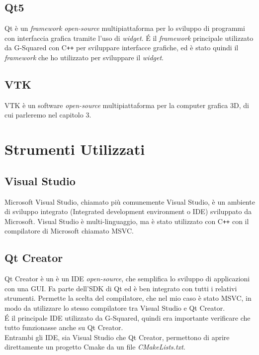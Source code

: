 \subsection{Qt5}\label{sec:Qt5}
Qt è un \emph{framework} \emph{open-source} multipiattaforma per lo sviluppo di programmi con interfaccia grafica tramite l'uso di \emph{widget}.
\'E il \emph{framework} principale utilizzato da G-Squared con C\texttt{++} per sviluppare interfacce grafiche, ed è stato quindi il \emph{framework} che ho utilizzato per sviluppare il \emph{widget}.

\subsection{VTK}
VTK è un software \emph{open-source} multipiattaforma per la computer grafica 3D, di cui parleremo nel capitolo 3.

\section{Strumenti Utilizzati}
\subsection{Visual Studio}\label{sec:visual-studio}
Microsoft Visual Studio, chiamato più comunemente Visual Studio, è un ambiente di sviluppo integrato (Integrated development environment o IDE) sviluppato da Microsoft.
Visual Studio è multi-linguaggio, ma è stato utilizzato con C\texttt{++} con il compilatore di Microsoft chiamato MSVC.

\subsection{Qt Creator}\label{sec:qt-creator}
Qt Creator è un è un IDE \emph{open-source}, che semplifica lo sviluppo di applicazioni con una GUI. Fa parte dell'SDK di Qt ed è ben integrato con tutti i relativi strumenti. Permette la scelta del compilatore, che nel mio caso è stato MSVC, in modo da utilizzare lo stesso compilatore tra Visual Studio e Qt Creator.
\\
\'E il principale IDE utilizzato da G-Squared, quindi era importante verificare che tutto funzionasse anche su Qt Creator.
\\
Entrambi gli IDE, sia Visual Studio che Qt Creator, permettono di aprire direttamente un progetto Cmake da un file \emph{CMakeLists.txt}.

